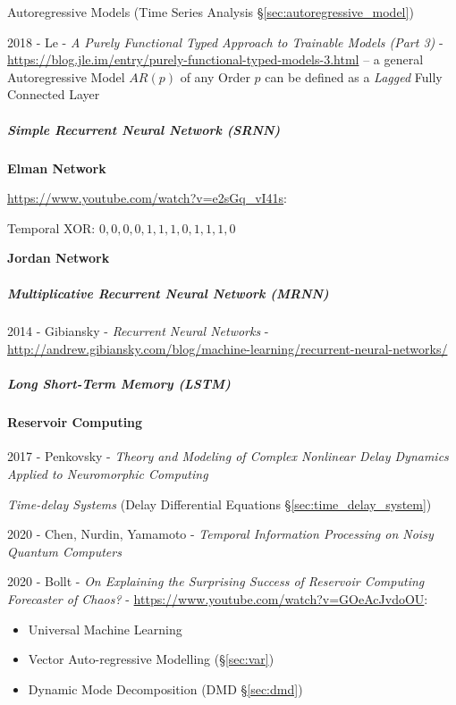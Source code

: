 \fist Autoregressive Models (Time Series Analysis
\S\ref{sec:autoregressive_model})

2018 - Le -
\emph{A Purely Functional Typed Approach to Trainable Models (Part 3)} -
\url{https://blog.jle.im/entry/purely-functional-typed-models-3.html}
-- a general Autoregressive Model $AR(p)$ of any Order $p$ can be defined as a
\emph{Lagged} Fully Connected Layer



\subparagraph{Simple Recurrent Neural Network (SRNN)}\label{sec:srnn}\hfill

\textbf{Elman Network}

\url{https://www.youtube.com/watch?v=e2sGq_vI41s}:

Temporal XOR:
$0, 0, 0, 0, 1, 1, 1, 0, 1, 1, 1, 0$


\textbf{Jordan Network}



\subparagraph{Multiplicative Recurrent Neural Network (MRNN)}\label{sec:mrnn}
\hfill

2014 - Gibiansky - \emph{Recurrent Neural Networks} -
\url{http://andrew.gibiansky.com/blog/machine-learning/recurrent-neural-networks/}



\subparagraph{Long Short-Term Memory (LSTM)}\label{sec:lstm}\hfill



\paragraph{Reservoir Computing}\label{sec:reservoir_computing}\hfill

2017 - Penkovsky - \emph{Theory and Modeling of Complex Nonlinear Delay Dynamics
  Applied to Neuromorphic Computing}

\emph{Time-delay Systems} (Delay Differential Equations
\S\ref{sec:time_delay_system})

2020 - Chen, Nurdin, Yamamoto - \emph{Temporal Information Processing on Noisy
  Quantum Computers}

2020 - Bollt - \emph{On Explaining the Surprising Success of Reservoir Computing
  Forecaster of Chaos?} - \url{https://www.youtube.com/watch?v=GOeAcJvdoOU}:

\begin{itemize}
  \item Universal Machine Learning
  \item Vector Auto-regressive Modelling (\S\ref{sec:var})
  \item Dynamic Mode Decomposition (DMD \S\ref{sec:dmd})
\end{itemize}

